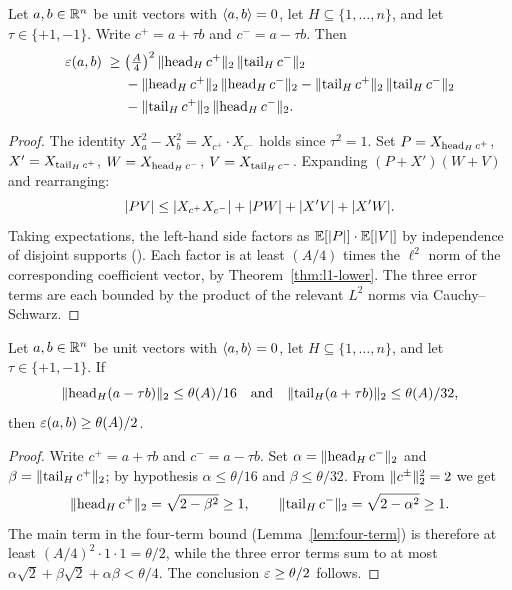 \begin{lemma}\label{lem:four-term}
Let $a, b \in \mathbb{R}^n$ be unit vectors with $\langle a,b\rangle = 0$, let
$H \subseteq \{1, \dots, n\}$, and let $\tau \in \{+1, -1\}$. Write
$c^+ = a + \tau b$ and $c^- = a - \tau b$. Then
\begin{align*}
\varepsilon(a,b) \;\ge\;
&\bigl(\tfrac{A}{4}\bigr)^2\,
  \lVert \operatorname{head}_H c^+ \rVert_2 \, \lVert \operatorname{tail}_H c^- \rVert_2 \\
&{}- \lVert \operatorname{head}_H c^+ \rVert_2 \, \lVert \operatorname{head}_H c^- \rVert_2
 - \lVert \operatorname{tail}_H c^+ \rVert_2 \, \lVert \operatorname{tail}_H c^- \rVert_2 \\
&{}- \lVert \operatorname{tail}_H c^+ \rVert_2 \, \lVert \operatorname{head}_H c^- \rVert_2.
\end{align*}
\end{lemma}

\begin{proof}
The identity $X_a^2 - X_b^2 = X_{c^+} \cdot X_{c^-}$ holds since
$\tau^2 = 1$. Set $P = X_{\operatorname{head}_H c^+}$, $X' = X_{\operatorname{tail}_H c^+}$,
$W = X_{\operatorname{head}_H c^-}$, $V = X_{\operatorname{tail}_H c^-}$. Expanding
$(P + X')(W + V)$ and rearranging:
\[
\lvert PV \rvert
\le \lvert X_{c^+} X_{c^-} \rvert + \lvert PW \rvert + \lvert X'V \rvert + \lvert X'W \rvert.
\]
Taking expectations, the left-hand side factors as
$\mathbb{E}[\lvert P \rvert] \cdot \mathbb{E}[\lvert V \rvert]$ by independence of disjoint supports
().
Each factor is at least $(A/4)$ times the $\ell^2$ norm of the
corresponding coefficient vector, by Theorem~\ref{thm:l1-lower}. The
three error terms are each bounded by the product of the relevant $L^2$
norms via Cauchy--Schwarz.
\end{proof}

\begin{proposition}[Gluing]\label{thm:gluing}
Let $a, b \in \mathbb{R}^n$ be unit vectors with $\langle a,b\rangle = 0$, let
$H \subseteq \{1, \dots, n\}$, and let $\tau \in \{+1, -1\}$.
If
\[
\lVert \operatorname{head}_H(a - \tau b) \rVert_2 \le \theta(A)/16
\quad \text{and} \quad
\lVert \operatorname{tail}_H(a + \tau b) \rVert_2 \le \theta(A)/32,
\]
then $\varepsilon(a,b) \ge \theta(A)/2$.
\end{proposition}

\begin{proof}
Write $c^+ = a + \tau b$ and $c^- = a - \tau b$. Set
$\alpha = \lVert \operatorname{head}_H c^- \rVert_2$ and $\beta = \lVert \operatorname{tail}_H c^+ \rVert_2$;
by hypothesis $\alpha \le \theta/16$ and $\beta \le \theta/32$.
From $\lVert c^\pm \rVert_2^2 = 2$ we get
\[
\lVert \operatorname{head}_H c^+ \rVert_2
= \sqrt{2 - \beta^2} \ge 1,
\qquad
\lVert \operatorname{tail}_H c^- \rVert_2
= \sqrt{2 - \alpha^2} \ge 1.
\]
The main term in the four-term bound (Lemma~\ref{lem:four-term}) is
therefore at least
$(A/4)^2 \cdot 1 \cdot 1 = \theta/2$, while the three error terms sum to
at most $\alpha \sqrt{2} + \beta \sqrt{2} + \alpha\beta < \theta/4$.
The conclusion $\varepsilon \ge \theta/2$ follows.
\end{proof}
